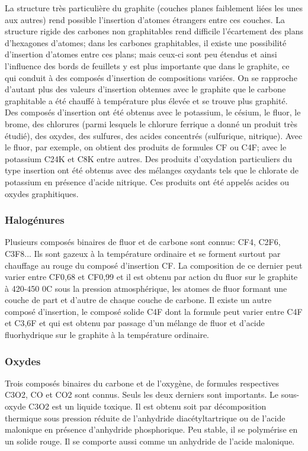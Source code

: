 \documentclass[a4 paper, 10 pt]{article}
\begin{document}
La structure très particulière du graphite (couches planes
faiblement liées les unes aux autres) rend possible l'insertion
d'atomes étrangers entre ces couches. La structure rigide des
carbones non graphitables rend difficile l'écartement des plans
d'hexagones d'atomes; dans les carbones graphitables, il existe une
possibilité d'insertion d'atomes entre ces plans; mais ceux-ci sont
peu étendus et ainsi l'influence des bords de feuillets y est plus
importante que dans le graphite, ce qui conduit à des composés
d'insertion de compositions variées. On se rapproche d'autant plus
des valeurs d'insertion obtenues avec le graphite que le carbone
graphitable a été chauffé à température plus
élevée et se trouve plus graphité.  Des composés
d'insertion ont été obtenus avec le potassium, le césium, le
fluor, le brome, des chlorures (parmi lesquels le chlorure ferrique a
donné un produit très étudié), des oxydes, des sulfures,
des acides concentrés (sulfurique, nitrique). Avec le fluor, par
exemple, on obtient des produits de formules CF ou C4F; avec le
potassium C24K et C8K entre autres. Des produits d'oxydation
particuliers du type insertion ont été obtenus avec des
mélanges oxydants tels que le chlorate de potassium en présence
d'acide nitrique. Ces produits ont été appelés acides ou
oxydes graphitiques.




\subsubsection{Halogénures}

Plusieurs composés binaires de fluor et de carbone sont connus:
CF4, C2F6, C3F8... Ils sont gazeux à la température ordinaire et
se forment surtout par chauffage au rouge du composé d'insertion
CF. La composition de ce dernier peut varier entre CF0,68 et CF0,99 et
il est obtenu par action du fluor sur le graphite à 420-450 0C
sous la pression atmosphérique, les atomes de fluor formant une
couche de part et d'autre de chaque couche de carbone. Il existe un
autre composé d'insertion, le composé solide C4F dont la formule
peut varier entre C4F et C3,6F et qui est obtenu par passage d'un
mélange de fluor et d'acide fluorhydrique sur le graphite à la
température ordinaire.  

\subsubsection{Oxydes} 

Trois composés binaires du carbone et de l'oxygène, de formules
respectives C3O2, CO et CO2 sont connus. Seuls les deux derniers sont
importants. Le sous-oxyde C3O2 est un liquide toxique. Il est obtenu
soit par décomposition thermique sous pression réduite de
l'anhydride diacétyltartrique ou de l'acide malonique en
présence d'anhydride phosphorique. Peu stable, il se polymérise
en un solide rouge. Il se comporte aussi comme un anhydride de l'acide
malonique.
\end{document}
